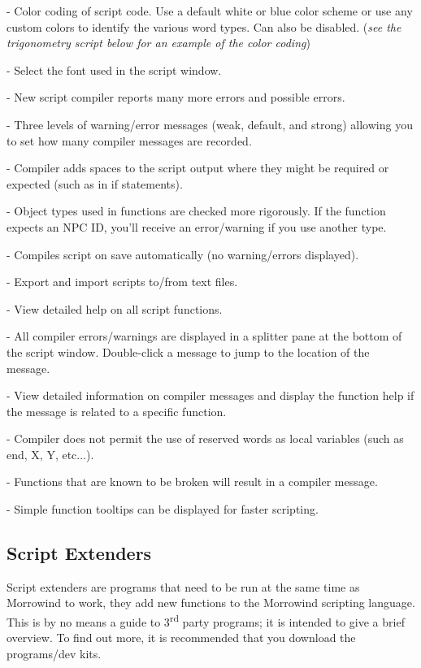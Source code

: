 - Color coding of script code. Use a default white or blue color scheme
or use any custom colors to identify the various word types. Can also be
disabled. (\emph{see the trigonometry script below for an example of the
color coding})

- Select the font used in the script window.

- New script compiler reports many more errors and possible errors.

- Three levels of warning/error messages (weak, default, and strong)
allowing you to set how many compiler messages are recorded.

- Compiler adds spaces to the script output where they might be required
or expected (such as in if statements).

- Object types used in functions are checked more rigorously. If the
function expects an NPC ID, you'll receive an error/warning if you use
another type.

- Compiles script on save automatically (no warning/errors displayed).

- Export and import scripts to/from text files.

- View detailed help on all script functions.

- All compiler errors/warnings are displayed in a splitter pane at the
bottom of the script window. Double-click a message to jump to the
location of the message.

- View detailed information on compiler messages and display the
function help if the message is related to a specific function.

- Compiler does not permit the use of reserved words as local variables
(such as end, X, Y, etc...).

- Functions that are known to be broken will result in a compiler
message.

- Simple function tooltips can be displayed for faster scripting.

\hypertarget{script-extenders}{%
\subsection{Script Extenders}\label{script-extenders}}

Script extenders are programs that need to be run at the same time as
Morrowind to work, they add new functions to the Morrowind scripting
language.\\
This is by no means a guide to 3\textsuperscript{rd} party programs; it
is intended to give a brief overview. To find out more, it is
recommended that you download the programs/dev kits.

